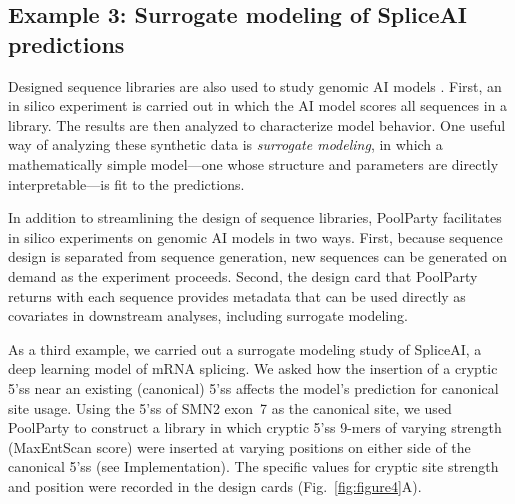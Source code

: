\documentclass[pdflatex,sn-vancouver-num,referee,oneside]{sn-jnl}
\begin{document}
\subsection*{Example 3: Surrogate modeling of SpliceAI predictions}\label{subsec:example3-spliceai}

Designed sequence libraries are also used to study genomic AI models \citep{Avsec2021bpnet, Toneyan2024creme, Seitz2024squid, Nagai2026review}. First, an in silico experiment is carried out in which the AI model scores all sequences in a library. The results are then analyzed to characterize model behavior. One useful way of analyzing these synthetic data is \emph{surrogate modeling}, in which a mathematically simple model---one whose structure and parameters are directly interpretable---is fit to the predictions.

In addition to streamlining the design of sequence libraries, PoolParty facilitates in silico experiments on genomic AI models in two ways. First, because sequence design is separated from sequence generation, new sequences can be generated on demand as the experiment proceeds. Second, the design card that PoolParty returns with each sequence provides metadata that can be used directly as covariates in downstream analyses, including surrogate modeling.

As a third example, we carried out a surrogate modeling study of SpliceAI, a deep learning model of mRNA splicing. We asked how the insertion of a cryptic 5'ss near an existing (canonical) 5'ss affects the model's prediction for canonical site usage. Using the 5'ss of SMN2 exon~7 as the canonical site, we used PoolParty to construct a library in which cryptic 5'ss 9-mers of varying strength (MaxEntScan score) were inserted at varying positions on either side of the canonical 5'ss (see Implementation). The specific values for cryptic site strength and position were recorded in the design cards (Fig.~\ref{fig:figure4}A).
\end{document}
